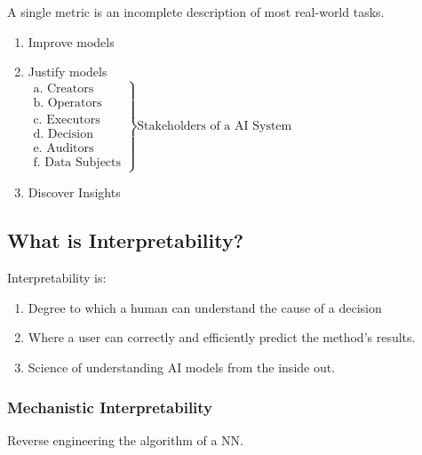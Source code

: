 \begin{motivation}
    A single metric is an incomplete description of most real-world tasks. 
    \begin{enumerate}
        \item Improve models
        \item Justify models \\
        $
        \left.
        \begin{array}{l}
        \text{a. Creators} \\
        \text{b. Operators} \\
        \text{c. Executors} \\
        \text{d. Decision} \\
        \text{e. Auditors} \\
        \text{f. Data Subjects}
        \end{array}
        \right\} \text{Stakeholders of a AI System}
        $
        \item Discover Insights 
    \end{enumerate}
\end{motivation}

\subsection{What is Interpretability?}
\begin{definition}
    Interpretability is:
    \begin{enumerate}
        \item Degree to which a human can understand the cause of a decision
        \item Where a user can correctly and efficiently predict the method's results. 
        \item Science of understanding AI models from the inside out. 
    \end{enumerate}
\end{definition}

\subsubsection{Mechanistic Interpretability}
\begin{definition}
    Reverse engineering the algorithm of a NN. 
\end{definition}

